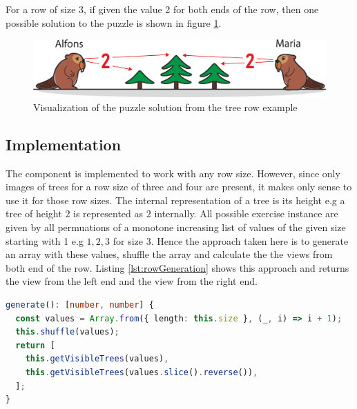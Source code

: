 \begin{example}
    For a row of size 3, if given the value 2 for both ends of the row, then one possible solution to the puzzle is shown in figure \ref{fig:tree_row_example}.
\end{example}

\begin{figure} 
    \centering
    \includegraphics[width=0.8 \columnwidth]{figures/tree_row_example.png}
    \caption{Visualization of the puzzle solution from the tree row example} 
    \label{fig:tree_row_example} 
\end{figure}

\subsection{Implementation}

The  component is implemented to work with any row size. However, since only images of trees for a row size of three and four are present, it makes only sense to use it for those row sizes.
The internal representation of a tree is its height e.g a tree of height $2$ is represented as $2$ internally.
All possible exercise instance are given by all permuations of a monotone increasing list of values of the given size starting with 1 e.g $1,2,3$ for size 3. Hence the approach taken here is to generate an array with these values, shuffle the array and calculate the the views from both end of the row. Listing \ref{lst:rowGeneration} shows this approach and returns the view from the left end and the view from the right end.

\begin{lstlisting}[language=TypeScript,caption={Algorithm to generate a row of trees exercise instance of \code{this.size}},label={lst:rowGeneration}]
generate(): [number, number] {
  const values = Array.from({ length: this.size }, (_, i) => i + 1);
  this.shuffle(values);
  return [
    this.getVisibleTrees(values),
    this.getVisibleTrees(values.slice().reverse()),
  ];
}
\end{lstlisting}

